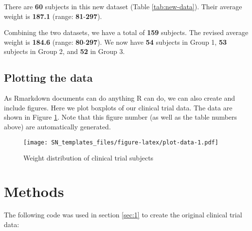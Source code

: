 \documentclass[smallextended]{svjour3}       %
\begin{document}
There are \textbf{60} subjects in this new dataset (Table \ref{tab:new-data}). Their average weight is \textbf{187.1} (range: \textbf{81}-\textbf{297}).

Combining the two datasets, we have a total of \textbf{159} subjects. The revised average weight is \textbf{184.6} (range: \textbf{80}-\textbf{297}). We now have \textbf{54} subjects in Group 1, \textbf{53} subjects in Group 2, and \textbf{52} in Group 3.

\hypertarget{sec:2}{%
\subsection{Plotting the data}\label{sec:2}}

As Rmarkdown documents can do anything R can do, we can also create and include figures. Here we plot boxplots of our clinical trial data. The data are shown in Figure \ref{fig:plot-data}. Note that this figure number (as well as the table numbers above) are automatically generated.

\begin{figure}
\centering
\texttt{[image: SN\_templates\_files/figure-latex/plot-data-1.pdf]}
\caption{\label{fig:plot-data}Weight distribution of clinical trial subjects}
\end{figure}

\hypertarget{methods}{%
\section{Methods}\label{methods}}

The following code was used in section \ref{sec:1} to create the original clinical trial data:
\end{document}

